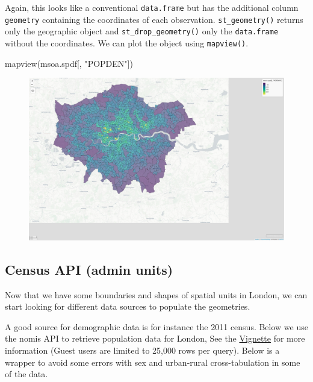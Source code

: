 \documentclass[
  letterpaper,
  DIV=11,
  numbers=noendperiod]{scrreprt}
\newenvironment{Shaded}{\begin{snugshade}}{\end{snugshade}}
\newcommand{\FunctionTok}[1]{\textcolor[rgb]{0.28,0.35,0.67}{#1}}
\newcommand{\NormalTok}[1]{\textcolor[rgb]{0.00,0.23,0.31}{#1}}
\newcommand{\StringTok}[1]{\textcolor[rgb]{0.13,0.47,0.30}{#1}}
\begin{document}
Again, this looks like a conventional \texttt{data.frame} but has the
additional column \texttt{geometry} containing the coordinates of each
observation. \texttt{st\_geometry()} returns only the geographic object
and \texttt{st\_drop\_geometry()} only the \texttt{data.frame} without
the coordinates. We can plot the object using \texttt{mapview()}.

\begin{Shaded}
\begin{Highlighting}[]
\FunctionTok{mapview}\NormalTok{(msoa.spdf[, }\StringTok{"POPDEN"}\NormalTok{])}
\end{Highlighting}
\end{Shaded}

\begin{figure}[H]

{\centering \includegraphics{01_refresher_short_files/figure-pdf/unnamed-chunk-9-1.pdf}

}

\end{figure}

\hypertarget{census-api-admin-units}{%
\subsection{Census API (admin units)}\label{census-api-admin-units}}

Now that we have some boundaries and shapes of spatial units in London,
we can start looking for different data sources to populate the
geometries.

A good source for demographic data is for instance the 2011 census.
Below we use the nomis API to retrieve population data for London, See
the
\href{https://cran.r-project.org/web/packages/nomisr/vignettes/introduction.html}{Vignette}
for more information (Guest users are limited to 25,000 rows per query).
Below is a wrapper to avoid some errors with sex and urban-rural
cross-tabulation in some of the data.
\end{document}

